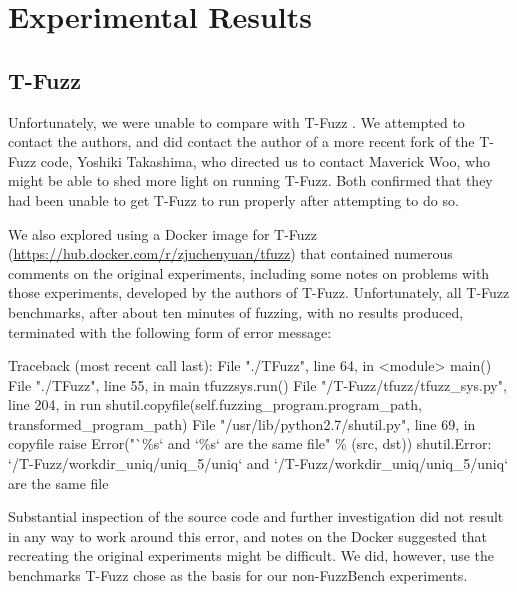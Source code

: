 \section{Experimental Results}

\subsection{T-Fuzz}

Unfortunately, we were unable to compare with T-Fuzz \cite{tfuzz}.  We attempted to contact the authors, and did contact the author of a more recent fork of the T-Fuzz code, Yoshiki Takashima, who directed us to contact Maverick Woo, who might be able to shed more light on running T-Fuzz.  Both confirmed that they had been unable to get T-Fuzz to run properly after attempting to do so.

We also explored using a Docker image for T-Fuzz (\url{https://hub.docker.com/r/zjuchenyuan/tfuzz}) that contained numerous comments on the original experiments, including some notes on problems with those experiments, developed by the authors of T-Fuzz.  Unfortunately, all T-Fuzz benchmarks, after about ten minutes of fuzzing, with no results produced, terminated with the following form of error message:

\begin{code}
  Traceback (most recent call last):
  File "./TFuzz", line 64, in <module>
    main()
  File "./TFuzz", line 55, in main
    tfuzzsys.run()
  File "/T-Fuzz/tfuzz/tfuzz\_sys.py", line 204, in run
    shutil.copyfile(self.fuzzing\_program.program\_path, transformed\_program\_path)
  File "/usr/lib/python2.7/shutil.py", line 69, in copyfile
    raise Error("`\%s` and `\%s` are the same file" \% (src, dst))
shutil.Error: `/T-Fuzz/workdir\_uniq/uniq\_5/uniq` and `/T-Fuzz/workdir\_uniq/uniq\_5/uniq` are the same file
\end{code}

Substantial inspection of the source code and further investigation did not result in any way to work around this error, and notes on the Docker suggested that recreating the original experiments might be difficult.  We did, however, use the benchmarks T-Fuzz chose as the basis for our non-FuzzBench experiments.